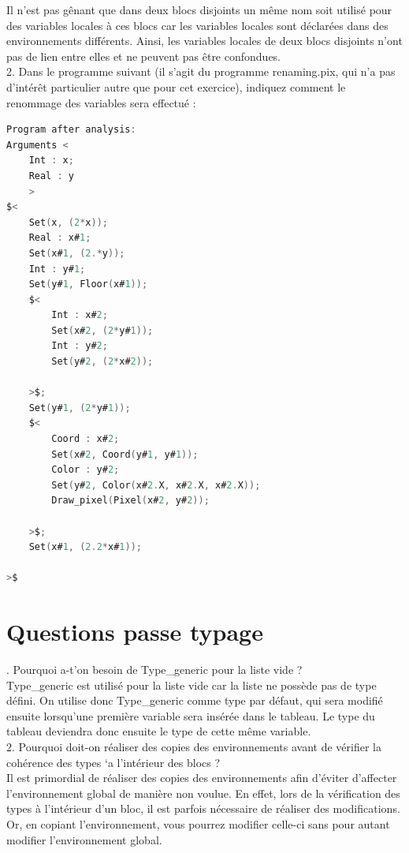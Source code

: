 \documentclass{report}
\begin{document}
    \quad Il n'est pas gênant que dans deux blocs disjoints un même nom soit utilisé pour des variables locales à ces blocs car les variables locales sont déclarées dans des environnements différents. Ainsi, les variables locales de deux blocs disjoints n'ont pas de lien entre elles et ne peuvent pas être confondues.\\

    2. Dans le programme suivant (il s'agit du programme renaming.pix, qui n'a pas d'intérêt particulier autre que pour cet exercice), indiquez comment le renommage des variables sera effectué :\\
    
    \begin{lstlisting}[language=C, basicstyle=\ttfamily]
Program after analysis:
Arguments <
    Int : x;
    Real : y
    >
$<
    Set(x, (2*x));
    Real : x#1;
    Set(x#1, (2.*y));
    Int : y#1;
    Set(y#1, Floor(x#1));
    $<
        Int : x#2;
        Set(x#2, (2*y#1));
        Int : y#2;
        Set(y#2, (2*x#2));
        
    >$;
    Set(y#1, (2*y#1));
    $<
        Coord : x#2;
        Set(x#2, Coord(y#1, y#1));
        Color : y#2;
        Set(y#2, Color(x#2.X, x#2.X, x#2.X));
        Draw_pixel(Pixel(x#2, y#2));
        
    >$;
    Set(x#1, (2.2*x#1));
    
>$
    \end{lstlisting}

    \newpage


    \section{Questions passe typage}

    . Pourquoi a-t'on besoin de Type\_generic pour la liste vide ?\\

    \quad Type\_generic est utilisé pour la liste vide car la liste ne possède pas de type défini. On utilise donc Type\_generic comme type par défaut, qui sera modifié ensuite lorsqu'une première variable sera insérée dans le tableau. Le type du tableau deviendra donc ensuite le type de cette même variable.\\

    2. Pourquoi doit-on réaliser des copies des environnements avant de vérifier la cohérence
        des types `a l'intérieur des blocs ?\\

    \quad Il est primordial de réaliser des copies des environnements afin d'éviter d'affecter l'environnement global de manière non voulue. En effet, lors de la vérification des types à l'intérieur d'un bloc, il est parfois nécessaire de réaliser des modifications. Or, en copiant l'environnement, vous pourrez modifier celle-ci sans pour autant modifier l'environnement global. \\
\end{document}
